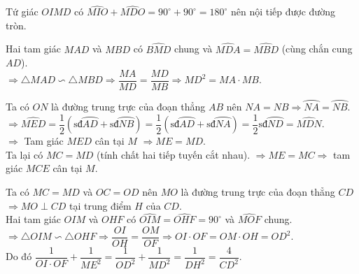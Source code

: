 \begin{ex}
{\begin{listEX}
       	 			Tứ giác $OIMD$ có $\widehat{MIO} + \widehat{MDO} = 90^\circ + 90^\circ = 180^\circ$ nên nội tiếp được đường tròn.
       	 	\item Hai tam giác $MAD$ và $MBD$ có $\widehat{BMD}$ chung và $\widehat{MDA} = \widehat{MBD}$ (cùng chắn cung $AD$).\\
       	 			$\Rightarrow \triangle MAD \backsim \triangle MBD \Rightarrow \dfrac{MA}{MD} = \dfrac{MD}{MB} \Rightarrow MD^2 = MA \cdot MB$.
        	\item Ta có $ON$ là đường trung trực của đoạn thẳng $AB$ nên $NA = NB \Rightarrow \wideparen{NA} = \wideparen{NB}$.\\
        			$\Rightarrow \widehat{MED} = \dfrac{1}{2}\left(\text{sđ}\wideparen{AD} + \text{sđ}\wideparen{NB}\right) = \dfrac{1}{2}\left(\text{sđ}\wideparen{AD} + \text{sđ}\wideparen{NA}\right) = \dfrac{1}{2}\text{sđ}\wideparen{ND} = \widehat{MDN}$.\\
        			$\Rightarrow$ Tam giác $MED$ cân tại $M$ $\Rightarrow ME = MD$.\\
        			Ta lại có $MC = MD$ (tính chất hai tiếp tuyến cắt nhau).
        			$\Rightarrow ME = MC \Rightarrow$ tam giác $MCE$ cân tại $M$.
        	\item Ta có $MC = MD$ và $OC = OD$ nên $MO$ là đường trung trực của đoạn thẳng $CD$ $\Rightarrow MO \perp CD$ tại trung điểm $H$ của $CD$.\\
        			Hai tam giác $OIM$ và $OHF$ có $\widehat{OIM} = \widehat{OHF} = 90^\circ$ và $\widehat{MOF}$ chung.\\
        			$\Rightarrow \triangle OIM \backsim \triangle OHF \Rightarrow \dfrac{OI}{OH} = \dfrac{OM}{OF} \Rightarrow OI \cdot OF = OM \cdot OH = OD^2$.\\
        			Do đó $\dfrac{1}{OI \cdot OF} + \dfrac{1}{ME^2} = \dfrac{1}{OD^2} + \dfrac{1}{MD^2} = \dfrac{1}{DH^2} = \dfrac{4}{CD^2}$.
    	\end{listEX}
	}
\end{ex}


